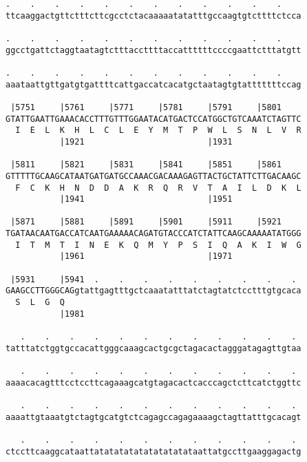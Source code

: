 \documentclass{article}
\begin{document}
\begin{Verbatim}
.    .    .    .    .    .    .    .    .    .    .    .    
ttcaaggactgttctttcttcgcctctacaaaaatatatttgccaagtgtcttttctcca
                                                            
.    .    .    .    .    .    .    .    .    .    .    .    
ggcctgattctaggtaatagtctttaccttttaccattttttccccgaattctttatgtt
                                                            
.    .    .    .    .    .    .    .    .    .    .    .    
aaataattgttgatgtgattttcattgaccatcacatgctaatagtgtatttttttccag
                                                            
 |5751     |5761     |5771     |5781     |5791     |5801    
GTATTGAATTGAAACACCTTTGTTTGGAATACATGACTCCATGGCTGTCAAATCTAGTTC
  I  E  L  K  H  L  C  L  E  Y  M  T  P  W  L  S  N  L  V  R
           |1921                         |1931              
  
 |5811     |5821     |5831     |5841     |5851     |5861    
GTTTTTGCAAGCATAATGATGATGCCAAACGACAAAGAGTTACTGCTATTCTTGACAAGC
  F  C  K  H  N  D  D  A  K  R  Q  R  V  T  A  I  L  D  K  L
           |1941                         |1951              
  
 |5871     |5881     |5891     |5901     |5911     |5921    
TGATAACAATGACCATCAATGAAAAACAGATGTACCCATCTATTCAAGCAAAAATATGGG
  I  T  M  T  I  N  E  K  Q  M  Y  P  S  I  Q  A  K  I  W  G
           |1961                         |1971              
  
 |5931     |5941  .    .    .    .    .    .    .    .    . 
GAAGCCTTGGGCAGgtattgagtttgctcaaatatttatctagtatctcctttgtgcaca
  S  L  G  Q                                                
           |1981                                            
  
   .    .    .    .    .    .    .    .    .    .    .    . 
tatttatctggtgccacattgggcaaagcactgcgctagacactagggatagagttgtaa
                                                            
   .    .    .    .    .    .    .    .    .    .    .    . 
aaaacacagtttcctccttcagaaagcatgtagacactcacccagctcttcatctggttc
                                                            
   .    .    .    .    .    .    .    .    .    .    .    . 
aaaattgtaaatgtctagtgcatgtctcagagccagagaaaagctagttatttgcacagt
                                                            
   .    .    .    .    .    .    .    .    .    .    .    . 
ctccttcaaggcataattatatatatatatatatatataattatgccttgaaggagactg
                                                            

\end{Verbatim}
\end{document}
